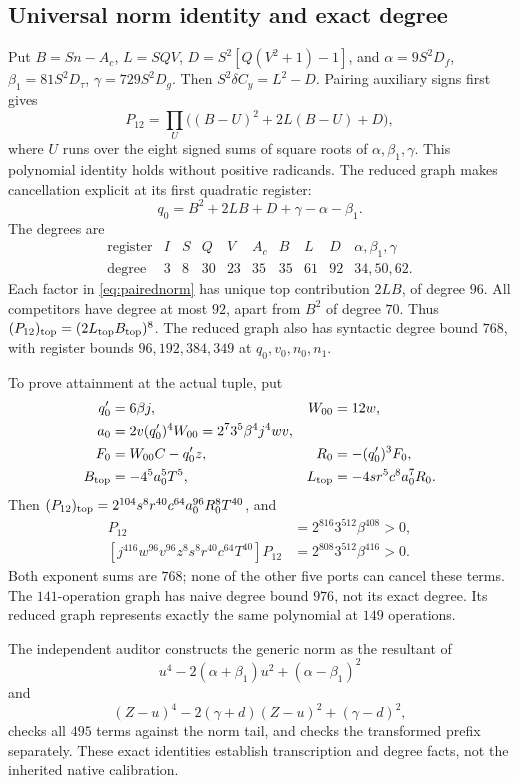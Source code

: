 \subsection{Universal norm identity and exact degree}
Put $B=Sn-A_c$, $L=SQV$, $D=S^2[Q(V^2+1)-1]$, and $\alpha=9S^2D_f$, $\beta_1=81S^2D_\tau$, $\gamma=729S^2D_g$. Then $S^2\delta C_y=L^2-D$. Pairing auxiliary signs first gives
\begin{equation}\label{eq:pairednorm}
 P_{12}=\prod_U\bigl((B-U)^2+2L(B-U)+D\bigr),
\end{equation}
where $U$ runs over the eight signed sums of square roots of $\alpha,\beta_1,\gamma$. This polynomial identity holds without positive radicands. The reduced graph makes cancellation explicit at its first quadratic register:
\[
 q_0=B^2+2LB+D+\gamma-\alpha-\beta_1.
\]
The degrees are
\[
\begin{array}{c|rrrrrrrrr}
\text{register}&I&S&Q&V&A_c&B&L&D&\alpha,\beta_1,\gamma\\\hline
\text{degree}&3&8&30&23&35&35&61&92&34,50,62.
\end{array}
\]
Each factor in \eqref{eq:pairednorm} has unique top contribution $2LB$, of degree $96$. All competitors have degree at most $92$, apart from $B^2$ of degree $70$. Thus $(P_{12})_{\rm top}=(2L_{\rm top}B_{\rm top})^8$. The reduced graph also has syntactic degree bound $768$, with register bounds $96,192,384,349$ at $q_0,v_0,n_0,n_1$.

To prove attainment at the actual tuple, put
\begin{align*}
 q_0'&=6\beta j,&W_{00}&=12w,\\
 a_0&=2v(q_0')^4W_{00}=2^7 3^5\beta^4j^4wv,\\
 F_0&=W_{00}C-q_0'z,&R_0&=-(q_0')^3F_0,\\
 B_{\rm top}&=-4^5a_0^5T^5,&L_{\rm top}&=-4sr^5c^8a_0^7R_0.
\end{align*}
Then $(P_{12})_{\rm top}=2^{104}s^8r^{40}c^{64}a_0^{96}R_0^8T^{40}$, and
\begin{align*}
 [j^{408}w^{104}v^{96}C^8s^8r^{40}c^{64}T^{40}]P_{12}
 &=2^{816}3^{512}\beta^{408}>0,\\
 [j^{416}w^{96}v^{96}z^8s^8r^{40}c^{64}T^{40}]P_{12}
 &=2^{808}3^{512}\beta^{416}>0.
\end{align*}
Both exponent sums are $768$; none of the other five ports can cancel these terms. The $141$-operation graph has naive degree bound $976$, not its exact degree. Its reduced graph represents exactly the same polynomial at $149$ operations.

The independent auditor constructs the generic norm as the resultant of
\[
 u^4-2(\alpha+\beta_1)u^2+(\alpha-\beta_1)^2
\]
and
\[
 (Z-u)^4-2(\gamma+d)(Z-u)^2+(\gamma-d)^2,
\]
checks all $495$ terms against the norm tail, and checks the transformed prefix separately. These exact identities establish transcription and degree facts, not the inherited native calibration.

